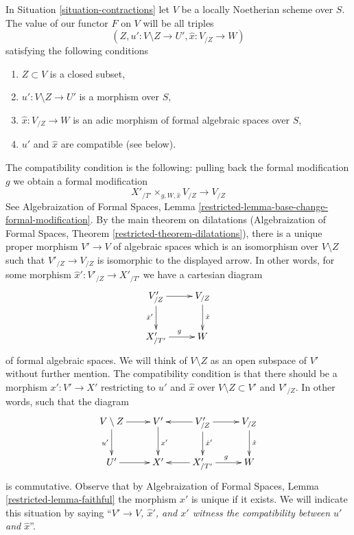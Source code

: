 \documentclass{stacks-project}
\theoremstyle{plain}
\theoremstyle{definition}
\theoremstyle{remark}
\numberwithin{equation}{subsection}
\begin{document}
\noindent
In Situation \ref{situation-contractions}
let $V$ be a locally Noetherian scheme over $S$.
The value of our functor $F$ on $V$ will be all triples
$$
(Z, u' : V \setminus Z \to U', \hat x : V_{/Z} \to W)
$$
satisfying the following conditions
\begin{enumerate}
\item $Z \subset V$ is a closed subset,
\item $u' : V \setminus Z \to U'$ is a morphism over $S$,
\item $\hat x : V_{/Z} \to W$ is an adic morphism of formal algebraic
spaces over $S$,
\item $u'$ and $\hat x$ are compatible (see below).
\end{enumerate}
The compatibility condition is the following: pulling back the
formal modification $g$ we obtain a formal modification
$$
X'_{/T'} \times_{g, W, \hat x} V_{/Z} \longrightarrow V_{/Z}
$$
See Algebraization of Formal Spaces, Lemma
\ref{restricted-lemma-base-change-formal-modification}.
By the main theorem on dilatations
(Algebraization of Formal Spaces, Theorem
\ref{restricted-theorem-dilatations}), there is a unique proper
morphism $V' \to V$ of algebraic spaces which is an isomorphism over
$V \setminus Z$ such that $V'_{/Z} \to V_{/Z}$ is isomorphic to the
displayed arrow. In other words, for some morphism
$\hat x' : V'_{/Z} \to X'_{/T'}$ we have a cartesian diagram
$$
\xymatrix{
V'_{/Z} \ar[r] \ar[d]_{\hat x'} & V_{/Z} \ar[d]^{\hat x} \\
X'_{/T'} \ar[r]^g & W
}
$$
of formal algebraic spaces. We will think
of $V \setminus Z$ as an open subspace of $V'$ without further mention.
The compatibility condition is that there should be a
morphism $x' : V' \to X'$ restricting to $u'$ and $\hat x$
over $V \setminus Z \subset V'$ and $V'_{/Z}$.
In other words, such that the diagram
$$
\xymatrix{
V \setminus Z \ar[r] \ar[d]_{u'} &
V' \ar[d]^{x'} &
V'_{/Z} \ar[l] \ar[d]^{\hat x'} \ar[r] &
V_{/Z} \ar[d]^{\hat x} \\
U' \ar[r] &
X' &
X'_{/T'} \ar[r]^g \ar[l] &
W
}
$$
is commutative. Observe that by Algebraization of Formal Spaces,
Lemma \ref{restricted-lemma-faithful} the morphism $x'$ is unique
if it exists. We will indicate this situation by saying
``{\it $V' \to V$, $\hat x'$, and $x'$ witness the compatibility
between $u'$ and $\hat x$}''.
\end{document}
